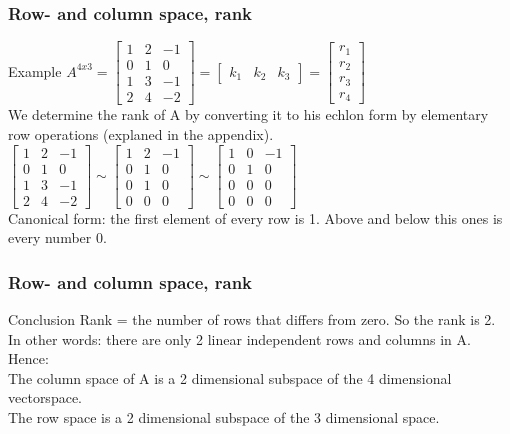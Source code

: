 \begin{frame}
	\frametitle{Row- and column space, rank}
	\begin{block}{Example}
		$A^{4x3}=\begin{bmatrix} 1 & 2 & -1 \\ 0 & 1 & 0 \\ 1 & 3 & -1 \\ 2 & 4 & -2 \end{bmatrix}= \begin{bmatrix} k_1 & k_2 & k_3 \end{bmatrix}= \begin{bmatrix} r_1\\r_2\\r_3\\r_4
		\end{bmatrix}$ \\
		We determine the rank of A by converting it to his echlon form by elementary row operations (explaned in the appendix).\\
		$\begin{bmatrix} 1 & 2 & -1 \\ 0 & 1 & 0 \\ 1 & 3 & -1 \\ 2 & 4 & -2 \end{bmatrix} \sim \begin{bmatrix} 1 & 2 & -1 \\ 0 & 1 & 0 \\ 0 & 1 & 0 \\ 0 & 0 & 0 \end{bmatrix} \sim \begin{bmatrix} 1 & 0 & -1 \\ 0 & 1 & 0 \\ 0 & 0 & 0 \\ 0 & 0 & 0 \end{bmatrix}$\\
		Canonical form: the first element of every row is 1. Above and below this ones is every number 0.\\
	\end{block}
\end{frame}

\begin{frame}
	\frametitle{Row- and column space, rank}
	\begin{block}{Conclusion}
		Rank = the number of rows that differs from zero. So the rank is 2. In other words: there are only 2 linear independent rows and columns in A. \\
		Hence:\\
		The column space of A is a 2 dimensional subspace of the 4 dimensional vectorspace.\\
		The row space is a 2 dimensional subspace of the 3 dimensional space.
	\end{block}
\end{frame}

